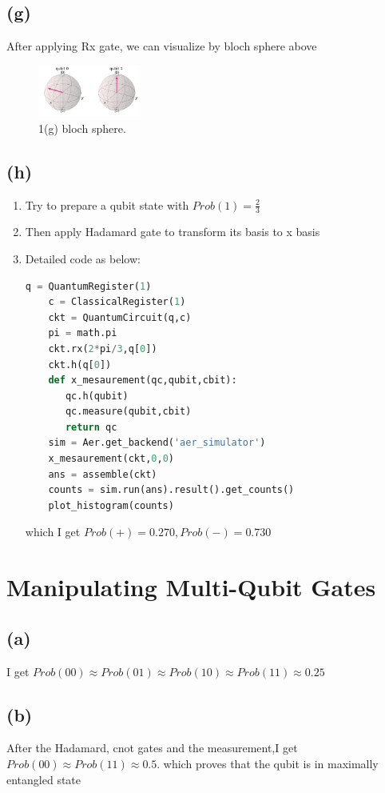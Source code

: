 \documentclass{article}
\begin{document}
\begin{CJK*}{UTF8}{bsmi}
\subsection{(g)}
After applying Rx gate, we can visualize by bloch sphere above

\begin{figure}
\centering
\includegraphics[width=0.3\textwidth]{1g.png}
\caption{\label{fig:frog}1(g) bloch sphere.}
\end{figure}

\subsection{(h)}
\begin{enumerate}
    \item Try to prepare a qubit state with $Prob(1) = \frac{2}{3}$
    \item Then apply Hadamard gate to transform its basis to x basis
    \item Detailed code as below:
    \begin{lstlisting}[language=Python]
    q = QuantumRegister(1)
    c = ClassicalRegister(1)
    ckt = QuantumCircuit(q,c)
    pi = math.pi
    ckt.rx(2*pi/3,q[0])
    ckt.h(q[0])
    def x_mesaurement(qc,qubit,cbit):
       qc.h(qubit)
       qc.measure(qubit,cbit)
       return qc
    sim = Aer.get_backend('aer_simulator')
    x_mesaurement(ckt,0,0)
    ans = assemble(ckt)
    counts = sim.run(ans).result().get_counts()  
    plot_histogram(counts)
    \end{lstlisting}
    which I get $Prob(+) = 0.270,Prob(-) = 0.730$
    
\end{enumerate}

\section{Manipulating Multi-Qubit Gates}
\subsection{(a)} 
I get $Prob(00) \approx Prob(01) \approx Prob(10) \approx Prob(11) \approx 0.25$

\subsection{(b)}
After the Hadamard, cnot gates and the measurement,I get $Prob(00) \approx Prob(11) \approx 0.5$. which proves that the qubit is in maximally entangled state


\end{CJK*}
\end{document}

